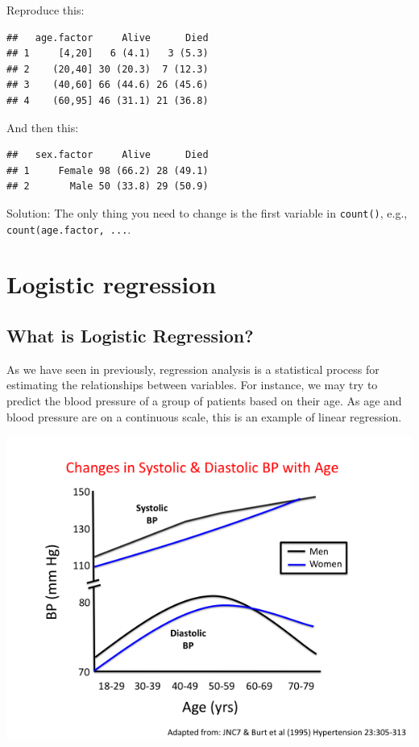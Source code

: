 \documentclass[12pt,]{krantz}
\theoremstyle{definition}
\theoremstyle{definition}
\theoremstyle{definition}
\theoremstyle{remark}
\begin{document}
Reproduce this:

\begin{verbatim}
##   age.factor     Alive      Died
## 1     [4,20]   6 (4.1)   3 (5.3)
## 2    (20,40] 30 (20.3)  7 (12.3)
## 3    (40,60] 66 (44.6) 26 (45.6)
## 4    (60,95] 46 (31.1) 21 (36.8)
\end{verbatim}

And then this:

\begin{verbatim}
##   sex.factor     Alive      Died
## 1     Female 98 (66.2) 28 (49.1)
## 2       Male 50 (33.8) 29 (50.9)
\end{verbatim}

Solution: The only thing you need to change is the first variable in
\texttt{count()}, e.g., \texttt{count(age.factor,\ ...}.

\hypertarget{logistic-regression}{%
\chapter{Logistic regression}\label{logistic-regression}}

\hypertarget{what-is-logistic-regression}{%
\section{What is Logistic
Regression?}\label{what-is-logistic-regression}}

As we have seen in previously, regression analysis is a statistical
process for estimating the relationships between variables. For
instance, we may try to predict the blood pressure of a group of
patients based on their age. As age and blood pressure are on a
continuous scale, this is an example of linear regression.

\includegraphics{images/age_bp.png}
\end{document}
